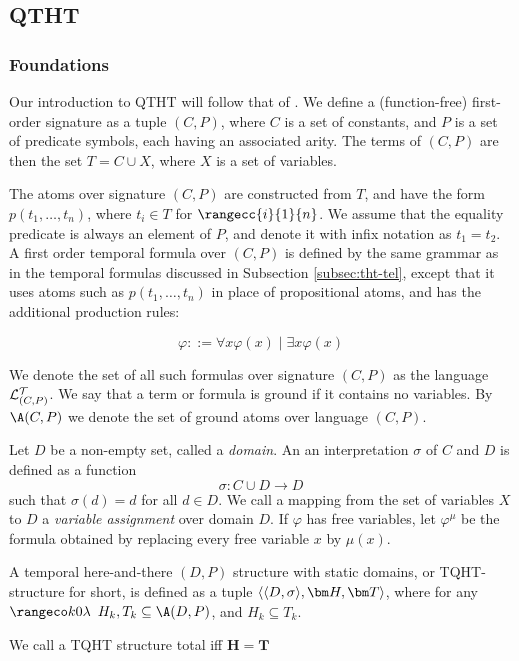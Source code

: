 \subsection{QTHT}

\subsubsection{Foundations}

Our introduction to QTHT will follow that of \cite{agcapevidi17a}. We
define a (function-free) first-order signature as a tuple $(C,P)$,
where $C$ is a set of constants, and $P$ is a set of predicate
symbols, each having an associated arity. The terms of $(C,P)$ are
then the set $T = C \cup X$, where $X$ is a set of variables.

The atoms over signature $(C,P)$ are constructed from $T$, and have
the form $p(t_1,\dots,t_n)$, where $t_i \in T$ for
$\rangecc{i}{1}{n}$. We assume that the equality predicate is always
an element of $P$, and denote it with infix notation as $t_1=t_2$. A
first order temporal formula over $(C,P)$ is defined by the same
grammar as in the temporal formulas discussed in Subsection
\ref{subsec:tht-tel}, except that it uses atoms such as
$p(t_1, \dots, t_n)$ in place of propositional atoms, and has the
additional production rules:

$$
\varphi ::= \forall x \varphi(x) \mid \exists x \varphi(x)
$$

We denote the set of all such formulas over signature $(C,P)$ as the
language $\mathcal{L}_{(C,P)}^\mathcal{T}$. We say that a term or formula is ground if it
contains no variables. By $\A(C,P)$ we denote the set of ground atoms
over language $(C,P)$.

Let $D$ be a non-empty set, called a \emph{domain}. An an
interpretation $\sigma$ of $C$ and $D$ is defined as a function
$$
\sigma: C \cup D \rightarrow D
$$
such that $\sigma(d) = d$ for all $d \in D$. We call a mapping from
the set of variables $X$ to $D$ a \textit{variable assignment} over
domain $D$. If $\varphi$ has free variables, let $\varphi^\mu$ be the
formula obtained by replacing every free variable $x$ by $\mu(x)$.

\begin{definition}
  A temporal here-and-there $(D,P)$ structure with static domains, or
  TQHT-structure for short, is defined as a tuple $\qthandt$, where
  for any $\kinlambda$ $H_k,T_k \subseteq \A(D,P)$, and
  $H_k \subseteq T_k$.

  We call a TQHT structure total iff $\bm{H}=\bm{T}$
\end{definition}


